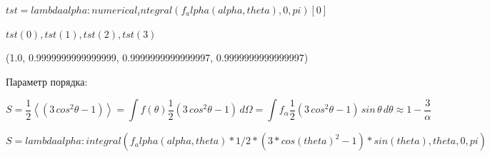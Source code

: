 \documentclass[11pt]{article}
\begin{document}
$tst = lambda alpha : numerical_integral(f_alpha(alpha, theta), 0, pi)[0]$


$tst(0), tst(1), tst(2), tst(3)$

(1.0, 0.9999999999999999, 0.9999999999999997, 0.9999999999999997)
        
    Параметр порядка:

\begin{equation}
S=\frac{1}{2}\left<\left(3\,cos^{2} \theta - 1 \right)\right> =
\int f\left(\theta\right)\frac{1}{2}\left(3\,cos^2\theta - 1\right)\,d\Omega =
\int f_{\alpha}\frac{1}{2}\left(3\,cos^2\theta - 1\right)\,sin\,\theta\,d\theta \approx 1-\frac{3}{\alpha}
\end{equation}

$S = lambda alpha : integral(f_alpha(alpha, theta)*1/2*(3*cos(theta)^2-1)*sin(theta), theta, 0, pi)$
\end{document}
